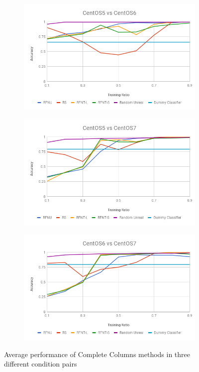 \documentclass[10pt, conference, compsocconf]{IEEEtran}
\begin{document}
\begin{figure}[h!]
        \centering
        \begin{subfigure}[b]{0.4\linewidth}
                \includegraphics[width=\columnwidth]{figures/simple-methods-5vs6}
        \end{subfigure}
        \begin{subfigure}[b]{0.4\linewidth}
		\includegraphics[width=\columnwidth]{figures/simple-methods-5vs7}
        \end{subfigure}
        \begin{subfigure}[b]{0.4\linewidth}
                \includegraphics[width=\columnwidth]{figures/simple-methods-6vs7}
        \end{subfigure}
	\caption{Average performance of Complete Columns methods in three different condition pairs}
	\label{fig:simple-methods}
\end{figure}
\end{document}
